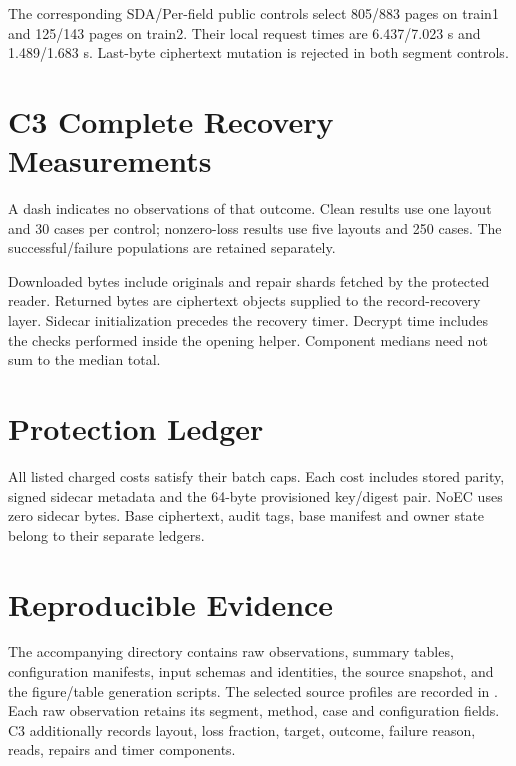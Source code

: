 \documentclass[10pt,journal,onecolumn]{IEEEtran}
\begin{document}




The corresponding SDA/Per-field public controls select 805/883 pages on train1 and 125/143 pages on train2. Their local request times are 6.437/7.023 s and 1.489/1.683 s. Last-byte ciphertext mutation is rejected in both segment controls.

\section{C3 Complete Recovery Measurements}





A dash indicates no observations of that outcome. Clean results use one layout and 30 cases per control; nonzero-loss results use five layouts and 250 cases. The successful/failure populations are retained separately.



Downloaded bytes include originals and repair shards fetched by the protected reader. Returned bytes are ciphertext objects supplied to the record-recovery layer. Sidecar initialization precedes the recovery timer. Decrypt time includes the checks performed inside the opening helper. Component medians need not sum to the median total.

\section{Protection Ledger}



All listed charged costs satisfy their batch caps. Each cost includes stored parity, signed sidecar metadata and the 64-byte provisioned key/digest pair. NoEC uses zero sidecar bytes. Base ciphertext, audit tags, base manifest and owner state belong to their separate ledgers.

\section{Reproducible Evidence}
The accompanying  directory contains raw observations,
summary tables, configuration manifests, input schemas and identities, the source
snapshot, and the figure/table generation scripts. The selected source profiles
are recorded in . Each raw observation retains
its segment, method, case and configuration fields. C3 additionally records layout,
loss fraction, target, outcome, failure reason, reads, repairs and timer components.
\end{document}
